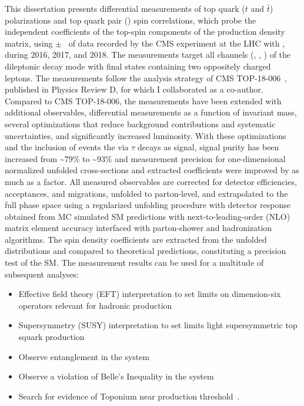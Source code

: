 This dissertation presents differential measurements of top quark ($t$ and $\bar{t}$) polarizations and top quark pair (\ttbar) spin correlations, which probe the independent coefficients of the top-spin components of the \ttbar production density matrix, using \lumivalueRuniiUL $\pm$ \lumierrRuniiUL\ of data recorded by the CMS experiment at the LHC with \beamenergy, during 2016, 2017, and 2018.
The measurements target all channels (\ee, \emu, \mumu) of the \ttbar dileptonic decay mode with final states containing two oppositely charged leptons.
The measurements follow the analysis strategy of CMS TOP-18-006~\cite{Sirunyan:2681777}, published in Physics Review D, for which I collaborated as a co-author.
Compared to CMS TOP-18-006, the measurements have been extended with additional observables, differential measurements as a function of \ttbar invariant mass, several optimizations that reduce background contributions and systematic uncertainties, and significantly increased luminosity.
With these optimizations and the inclusion of \ttbar events the via $\tau$ decays as signal, signal purity has been increased from \sim$79\%$ to \sim$93\%$ and measurement precision for one-dimensional normalized unfolded cross-sections and extracted coefficients were improved by as much as a factor.
All measured observables are corrected for detector efficiencies, acceptances, and migrations, unfolded to parton-level, and extrapolated to the full phase space using a regularized unfolding procedure with detector response obtained from MC simulated SM predictions with next-to-leading-order (NLO) matrix element accuracy interfaced with parton-shower and hadronization algorithms.
The spin density coefficients are extracted from the unfolded distributions and compared to theoretical predictions, constituting a precision test of the SM.
The measurement results can be used for a multitude of subsequent analyses:
\begin{itemize}
    \item Effective field theory (EFT) interpretation to set limits on dimension-six operators relevant for hadronic \ttbar production~\cite{Sirunyan:2681777}
    \item Supersymmetry (SUSY) interpretation to set limits light supersymmetric top squark production~\cite{CMS-PAS-FTR-18-034}
    \item Observe entanglement in the \ttbar system~\cite{Afik_2021}
    \item Observe a violation of Belle's Inequality in the \ttbar system~\cite{Aguilar_Saavedra_2022}
    \item Search for evidence of Toponium near \ttbar production threshold~\cite{PhysRevD.104.034023}.
\end{itemize}

